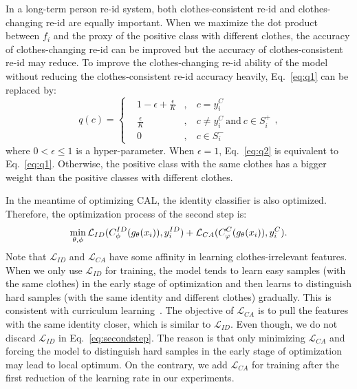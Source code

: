\documentclass[10pt,twocolumn,letterpaper]{article}
\begin{document}
In a long-term person re-id system, both clothes-consistent re-id and clothes-changing re-id are equally important.
When we maximize the dot product between $f_i$ and the proxy of the positive class with different clothes, the accuracy of clothes-changing re-id can be improved but the accuracy of clothes-consistent re-id may reduce. 
To improve the clothes-changing re-id ability of the model without reducing the clothes-consistent re-id accuracy heavily, Eq.~\eqref{eq:q1} can be replaced by:
\begin{equation}\label{eq:q2}
	q(c)=\left\{
	\begin{aligned}
		&1-\epsilon+\frac{\epsilon}{K}  &, & \ c=y_i^C \\
		&\frac{\epsilon}{K}  &, & \ c\ne y_i^C \ \text{and} \ c\in S_i^+ \\
		&0 &, & \ c\in S_i^-
	\end{aligned}
	\right.,
\end{equation}
where $0<\epsilon\leq 1$ is a hyper-parameter.
When $\epsilon=1$, Eq.~\eqref{eq:q2} is equivalent to Eq.~\eqref{eq:q1}.
Otherwise, the positive class with the same clothes has a bigger weight than the positive classes with different clothes.

In the meantime of optimizing CAL, the identity classifier is also optimized.
Therefore, the optimization process of the second step is:
\begin{equation}\label{eq:secondstep}
	\small
	\min_{\theta, \phi} \mathcal{L}_{ID}(C^{ID}_{\phi}(g_{\theta}(x_i)), y^{ID}_i) + \mathcal{L}_{CA}(C^{C}_{\varphi}(g_{\theta}(x_i)), y^{C}_i).
\end{equation}
Note that $\mathcal{L}_{ID}$ and $\mathcal{L}_{CA}$ have some affinity in learning clothes-irrelevant features. When we only use $\mathcal{L}_{ID}$ for training, the model tends to learn easy samples (with the same clothes)
in the early stage of optimization and then learns to distinguish hard samples (with the same identity and different clothes) gradually. This is consistent with curriculum learning~\cite{Bengio2009Curriculum}.
The objective of $\mathcal{L}_{CA}$ is to pull the features with the same identity closer, which is similar to $\mathcal{L}_{ID}$. Even though, we do not discard $\mathcal{L}_{ID}$ in Eq.~\eqref{eq:secondstep}.
The reason is that only minimizing $\mathcal{L}_{CA}$ and forcing the model to distinguish hard samples in the early stage of optimization may lead to local optimum.
On the contrary, we add $\mathcal{L}_{CA}$ for training after the first reduction of the learning rate in our experiments.
\end{document}
